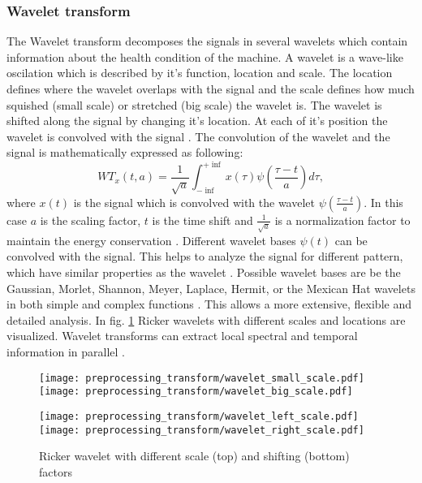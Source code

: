 \subsubsection{Wavelet transform}
The Wavelet transform decomposes the signals in several wavelets which contain information about the health condition of the machine. A wavelet is a wave-like oscilation which is described by it's function, location and scale. The location defines where the wavelet overlaps with the signal and the scale defines how much squished (small scale) or stretched (big scale) the wavelet is. The wavelet is shifted along the signal by changing it's location. At each of it's position the wavelet is convolved with the signal \cite{Shawhin2020}. The convolution of the wavelet and the signal is mathematically expressed as following:
\begin{equation}
    WT_{x}(t,a) = \frac{1}{\sqrt{a}} \int_{- \inf}^{+ \inf} x(\tau) \psi(\frac{\tau -t}{a}) d \tau,
\end{equation}
 where $x(t)$ is the signal which is convolved with the wavelet $\psi(\frac{\tau -t}{a})$. In this case $a$ is the scaling factor, $t$ is the time shift and $\frac{1}{\sqrt{a}}$ is a normalization factor to maintain the energy conservation \cite{FENG2013}. Different wavelet bases $\psi(t)$ can be convolved with the signal. This helps to analyze the signal for different pattern, which have similar properties as the wavelet \cite{Shawhin2020}. Possible wavelet bases are be the Gaussian, Morlet, Shannon, Meyer, Laplace, Hermit, or the Mexican Hat wavelets in both simple and complex functions \cite{Verstraete2017}. This allows a more extensive, flexible and detailed analysis. In fig. \ref{fig:ricker_wavelet} Ricker wavelets with different scales and locations are visualized. Wavelet transforms can extract local spectral and temporal information in parallel \cite{Shawhin2020}.


\begin{figure}[p]
  \centering
  \texttt{[image: preprocessing\_transform/wavelet\_small\_scale.pdf]}
  \hspace{.1cm}
  \texttt{[image: preprocessing\_transform/wavelet\_big\_scale.pdf]}
  
  \vspace{.1cm}
  
  \texttt{[image: preprocessing\_transform/wavelet\_left\_scale.pdf]}
  \hspace{.1cm}
  \texttt{[image: preprocessing\_transform/wavelet\_right\_scale.pdf]}

  \caption{Ricker wavelet with different scale (top) and shifting (bottom) factors}
  \label{fig:ricker_wavelet}
\end{figure}
\FloatBarrier 

